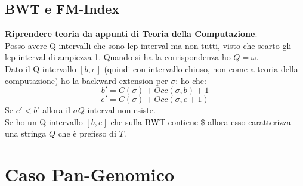 \documentclass[a4paper,12pt, oneside]{book}
\begin{document}
\subsection{BWT e FM-Index}
\textbf{Riprendere teoria da appunti di Teoria della Computazione}.\\
Posso avere Q-intervalli che sono lcp-interval ma non tutti, visto che scarto
gli lcp-interval di ampiezza 1. Quando si ha la corrispondenza ho $Q=\omega$.\\
Dato il Q-intervallo $[b,e]$ (quindi con intervallo chiuso, non come a teoria
della computazione) ho la backward extension per $\sigma$:
ho che:
\[b'=C(\sigma)+Occ(\sigma,b)+1\]
\[e'=C(\sigma)+Occ(\sigma,e+1)\]
Se $e'<b'$ allora il $\sigma Q$-interval non esiste.\\
Se ho un Q-intervallo $[b,e]$ che sulla BWT contiene \$ allora esso caratterizza
una stringa $Q$ che è prefisso di $T$.
\section{Caso Pan-Genomico}
\end{document}
